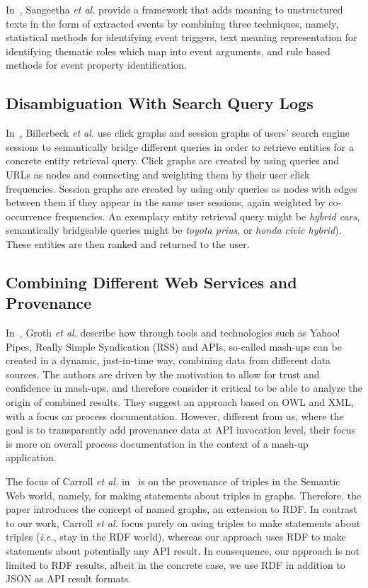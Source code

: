 In~\cite{Sangeetha}, Sangeetha \emph{et al.} provide a framework that adds meaning to unstructured texts in the form of extracted events by combining three techniques, 
namely, statistical methods for identifying event triggers, 
text meaning representation for identifying thematic 
roles which map into event arguments, and rule based 
methods for event property identification.

\subsection{Disambiguation With Search Query Logs}
In~\cite{Billerbeck:QueryLogs}, Billerbeck \emph{et al.} use click graphs and session graphs of users' search engine sessions
to semantically bridge different queries in order to retrieve entities for a concrete entity retrieval query. Click
graphs are created by using queries and URLs as nodes and connecting and weighting them by their user click
frequencies. Session graphs are created by using only queries as nodes with edges between them if they appear in the same user
sessions, again weighted by co-occurrence frequencies. An exemplary entity retrieval query might be \textit{hybrid
cars}, semantically bridgeable queries might be \textit{toyota prius}, or \textit{honda civic hybrid}). These entities
are then ranked and returned to the user.

\subsection{Combining Different Web Services and Provenance}
In~\cite{Groth:2009:MPD:1462159.1462162}, Groth \emph{et al.} describe how through tools and technologies such as Yahoo! Pipes, Really Simple Syndication (RSS) and APIs, so-called mash-ups can be created in a dynamic, just-in-time way, combining data from different data sources. The authors are driven by the motivation to allow for trust and confidence in mash-ups, and therefore consider it critical to be able to analyze the origin of combined results. They suggest an approach based on OWL and XML, with a focus on process documentation. However, different from us, where the goal is to transparently add provenance data at API invocation level, their focus is more on overall process documentation in the context of a mash-up application.

The focus of Carroll \emph{et al.} in~\cite{carroll2005} is on the provenance of triples in the Semantic Web world, namely, for making statements about triples in graphs. Therefore, the paper introduces the concept of named graphs, an extension to RDF. In contrast to our work, Carroll \emph{et al.} focus purely on using triples to make statements about triples (\emph{i.e.}, stay in the RDF world), whereas our approach uses RDF to make statements about potentially any API result. In consequence, our approach is not limited to RDF results, albeit in the concrete case, we use RDF in addition to JSON as API result formats.
 
